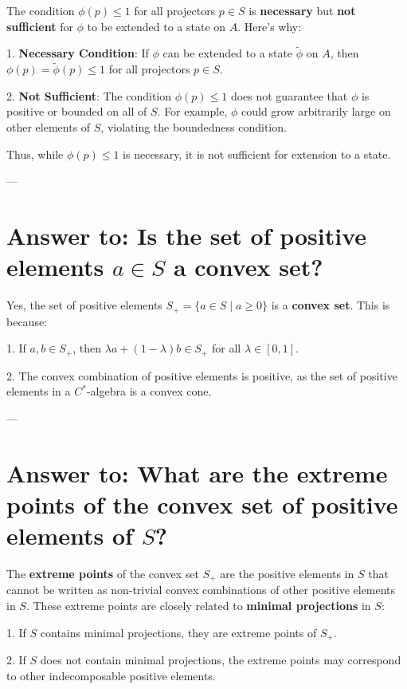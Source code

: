 \documentclass{article}
\begin{document}
The condition \( \phi(p) \leq 1 \) for all projectors \( p \in S \) is \textbf{necessary} but \textbf{not sufficient} for \( \phi \) to be extended to a state on \( A \). Here’s why:

1. \textbf{Necessary Condition}: If \( \phi \) can be extended to a state \( \tilde{\phi} \) on \( A \), then \( \phi(p) = \tilde{\phi}(p) \leq 1 \) for all projectors \( p \in S \).

2. \textbf{Not Sufficient}: The condition \( \phi(p) \leq 1 \) does not guarantee that \( \phi \) is positive or bounded on all of \( S \). For example, \( \phi \) could grow arbitrarily large on other elements of \( S \), violating the boundedness condition.

Thus, while \( \phi(p) \leq 1 \) is necessary, it is not sufficient for extension to a state.

---

\section*{Answer to: Is the set of positive elements \( a \in S \) a convex set?}

Yes, the set of positive elements \( S_+ = \{ a \in S \mid a \geq 0 \} \) is a \textbf{convex set}. This is because:

1. If \( a, b \in S_+ \), then \( \lambda a + (1 - \lambda) b \in S_+ \) for all \( \lambda \in [0, 1] \).

2. The convex combination of positive elements is positive, as the set of positive elements in a \( C^* \)-algebra is a convex cone.

---

\section*{Answer to: What are the extreme points of the convex set of positive elements of \( S \)?}

The \textbf{extreme points} of the convex set \( S_+ \) are the positive elements in \( S \) that cannot be written as non-trivial convex combinations of other positive elements in \( S \). These extreme points are closely related to \textbf{minimal projections} in \( S \):

1. If \( S \) contains minimal projections, they are extreme points of \( S_+ \).

2. If \( S \) does not contain minimal projections, the extreme points may correspond to other indecomposable positive elements.
\end{document}
